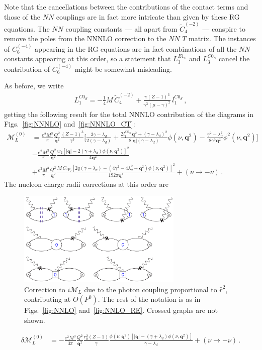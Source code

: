 \documentclass[prl,
twocolumn,
showpacs,preprintnumbers,amsmath,amssymb,
superscriptaddress,
a4paper,nofootinbib,longbibliography]{revtex4-2}
\def\bv#1{\boldsymbol{#1}}
\begin{document}
Note that the cancellations between the contributions of the contact terms and those of the $NN$ couplings are in fact more intricate than given by these RG equations. The $NN$ coupling constants --- all apart from $\tilde{C}_4^{(-2)}$ --- conspire to remove the poles from the NNNLO correction to the $NN$ $T$ matrix. The instances of $C_6^{(-4)}$ appearing in the RG equations are in fact combinations of all the $NN$ constants appearing at this order, so a statement that $L_3^{E1_V}$ and $L_3^{C0_S}$ cancel the contribution of $C_6^{(-4)}$ might be somewhat misleading.

As before, we write
\begin{align}
    L_1^{C0_S} =-\frac{1}{4}M\, \tilde{C}_4^{(-2)} +  \frac{\pi(Z-1)^3}{\gamma^3(\mu-\gamma)^2}\,l_1^{C0_S}\,,
\end{align}
getting the following result for the total NNNLO contribution of the diagrams in Figs.~\ref{fig:NNNLO} and~\ref{fig:NNNLO_CT}:
\begin{align}
    \mathcal{M}_L^{(0)} &=
    \frac{e^2M^3}{\pi}\frac{Q^2}{\bv{q}^2}\frac{(Z-1)^3}{\gamma^3}
    \Bigg[
    \frac{3 \gamma -\lambda_d}{2(\gamma -\lambda_d)}
    +\frac{2l_1^{C0_S}\, \bv{q}^2+(\gamma -\lambda_d)^2}{8 |\bv{q}|(\gamma-\lambda_d)}\phi(\nu,\bv{q}^2)
    -\frac{\gamma^2-\lambda_d^2 }{8 \gamma ^3 \bv{q}^2}\phi^2(\nu,\bv{q}^2)
    \Bigg]\nonumber \\
    &-\frac{e^2M^3}{\pi}\frac{Q^2}{\bv{q}^2}\frac{w_2 \left[|\bv{q}|-2 (\gamma +\lambda_d)\phi(\nu,\bv{q}^2)   \right]^2}{4 \bv{q}^2} \nonumber\\
    &+\frac{e^2M^3}{\pi}\frac{Q^2}{\bv{q}^2}
   \frac{M\,C_{{}^{3\!}P_J}\left[2 q (\gamma-\lambda_d)-\left(4 \gamma ^2-4 \lambda_d^2+\bv{q}^2\right) \phi(\nu,\bv{q}^2)\right]^2}{192 \pi  \bv{q}^4}
    +(\nu\to-\nu)\,.
\end{align}
The nucleon charge radii corrections at this order are
\begin{figure}[htb]
    \centering
    \includegraphics[width=0.7\textwidth]{figs/VVCS_NNNLO_RENucl.pdf}
    \caption{Correction to $i\mathcal{M}_L$ due to the photon coupling proportional to $\hat{r}^2$, contributing at $O(P^0)$. The rest of the notation is as in Figs.~\ref{fig:NNLO} and~\ref{fig:NNLO_RE}. Crossed graphs are not shown.}
    \label{fig:NNNLO_RE}
\end{figure}
\begin{align}
\delta\mathcal{M}_{L}^{(0)} & = -\frac{e^2 M^3}{3\pi}\frac{Q^2}{\bv{q}^2}
\frac{r_0^2 (Z-1)}{\gamma}\frac{\phi(\nu,\bv{q}^2)\left[|\bv{q}|-(\gamma +\lambda_d)\phi(\nu,\bv{q}^2)\right]}{\gamma-\lambda_d}+(\nu\to-\nu)\,.
\end{align}
\end{document}
